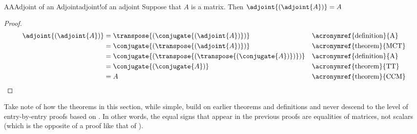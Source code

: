 %
\begin{theorem}{AA}{Adjoint of an Adjoint}{adjoint!of an adjoint}
Suppose that $A$ is a matrix.  Then $\adjoint{\left(\adjoint{A}\right)}=A$
\end{theorem}
%
\begin{proof}
%
\begin{align*}
\adjoint{\left(\adjoint{A}\right)}
&=\transpose{\left(\conjugate{\left(\adjoint{A}\right)}\right)}
&&\text{\acronymref{definition}{A}}\\
%
&=\conjugate{\left(\transpose{\left(\adjoint{A}\right)}\right)}
&&\text{\acronymref{theorem}{MCT}}\\
%
&=\conjugate{\left(\transpose{\left(\transpose{\left(\conjugate{A}\right)}\right)}\right)}
&&\text{\acronymref{definition}{A}}\\
%
&=\conjugate{\left(\conjugate{A}\right)}
&&\text{\acronymref{theorem}{TT}}\\
%
&=A
&&\text{\acronymref{theorem}{CCM}}
%
\end{align*}
%
\end{proof}
%
Take note of how the theorems in this section, while simple, build on earlier theorems and definitions and never descend to the level of entry-by-entry proofs based on .  In other words, the equal signs that appear in the previous proofs are equalities of matrices, not scalars (which is the opposite of a proof like that of ).
%
%



